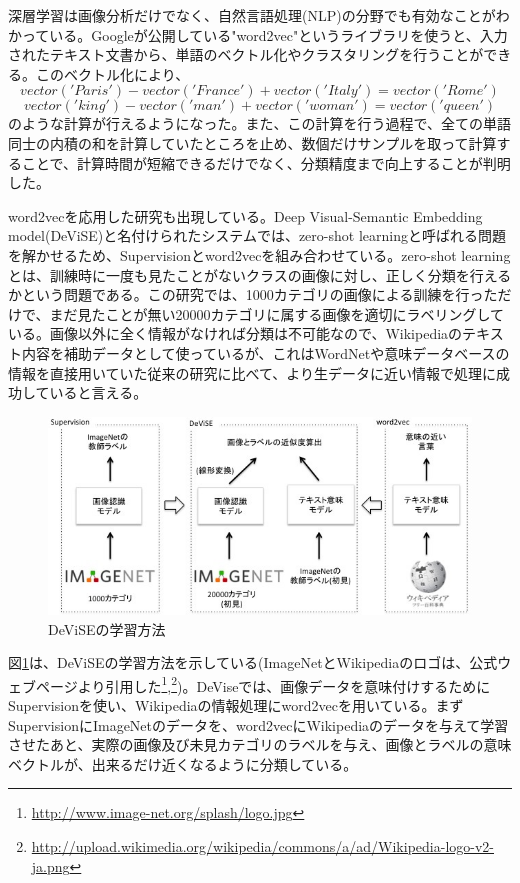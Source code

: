 深層学習は画像分析だけでなく、自然言語処理(NLP)の分野でも有効なことがわかっている。Googleが公開している"word2vec"というライブラリを使うと、入力されたテキスト文書から、単語のベクトル化やクラスタリングを行うことができる\cite{mikolov2013efficient}\cite{mikolov2013linguistic}。このベクトル化により、
\begin{equation}
vector('Paris') - vector('France') + vector('Italy') = vector('Rome')
\end{equation}
\begin{equation}
vector('king') - vector('man') + vector('woman') = vector('queen')
\end{equation}
のような計算が行えるようになった。また、この計算を行う過程で、全ての単語同士の内積の和を計算していたところを止め、数個だけサンプルを取って計算することで、計算時間が短縮できるだけでなく、分類精度まで向上することが判明した\cite{mikolov2013distributed}。\par
word2vecを応用した研究も出現している。Deep Visual-Semantic Embedding model(DeViSE)\cite{frome2013devise:}と名付けられたシステムでは、zero-shot learningと呼ばれる問題を解かせるため、Supervisionとword2vecを組み合わせている。zero-shot learningとは、訓練時に一度も見たことがないクラスの画像に対し、正しく分類を行えるかという問題である。この研究では、1000カテゴリの画像による訓練を行っただけで、まだ見たことが無い20000カテゴリに属する画像を適切にラベリングしている。画像以外に全く情報がなければ分類は不可能なので、Wikipediaのテキスト内容を補助データとして使っているが、これはWordNetや意味データベースの情報を直接用いていた従来の研究\cite{mensink2012metric}\cite{rohrbach2011evaluating}\cite{palatucci2009zero-shot}に比べて、より生データに近い情報で処理に成功していると言える。\par
\begin{figure}[tbp]
 \centering
  \includegraphics[width=120mm]{img/c3/devise}
 \caption{DeViSEの学習方法}
 \label{c3_devise}
\end{figure}
図\ref{c3_devise}は、DeViSEの学習方法を示している(ImageNetとWikipediaのロゴは、公式ウェブページより引用した\footnote{\url{http://www.image-net.org/splash/logo.jpg}},\footnote{\url{http://upload.wikimedia.org/wikipedia/commons/a/ad/Wikipedia-logo-v2-ja.png}})。DeViseでは、画像データを意味付けするためにSupervisionを使い、Wikipediaの情報処理にword2vecを用いている。まずSupervisionにImageNetのデータを、word2vecにWikipediaのデータを与えて学習させたあと、実際の画像及び未見カテゴリのラベルを与え、画像とラベルの意味ベクトルが、出来るだけ近くなるように分類している。\par
